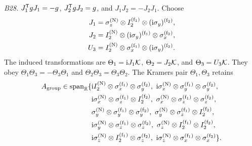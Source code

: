 \begin{samepage}
\medskip\noindent\textit{B28.}\quad
\(J_1^{\mathsf{T}} gJ_1=-g\), \(J_2^{\mathsf{T}} gJ_2=g\), and
\(J_1J_2=-J_2J_1\).
Choose
\begin{equation*}
\begin{aligned}
J_1&=\sigma_z^{({\rm N})}\otimes I_2^{({\rm f}_1)}
       \otimes(\mathrm{i}\sigma_y)^{({\rm f}_2)},\\
J_2&=I_2^{({\rm N})}\otimes(\mathrm{i}\sigma_y)^{({\rm f}_1)}
       \otimes\sigma_x^{({\rm f}_2)},\\
U_3&=I_2^{({\rm N})}\otimes\sigma_x^{({\rm f}_1)}
       \otimes(\mathrm{i}\sigma_y)^{({\rm f}_2)} .
\end{aligned}
\end{equation*}
The induced transformations are \(\Theta_1=\mathrm{i} J_1\mathcal{K}\),
\(\Theta_2=J_2\mathcal{K}\), and \(\Theta_3=U_3\mathcal{K}\).
They obey \(\Theta_1\Theta_3=-\Theta_3\Theta_1\) and
\(\Theta_2\Theta_3=\Theta_3\Theta_2\).  The Kramers pair
\(\Theta_1,\Theta_3\) retains
\begin{align*}
A_{\rm group}\in\operatorname{span}_{\mathbb R}\{&
\mathrm{i} I_2^{({\rm N})}\otimes\sigma_x^{({\rm f}_1)}\otimes\sigma_y^{({\rm f}_2)},
\ \mathrm{i}\sigma_x^{({\rm N})}\otimes\sigma_y^{({\rm f}_1)}\otimes\sigma_y^{({\rm f}_2)},\\
&\mathrm{i}\sigma_x^{({\rm N})}\otimes\sigma_z^{({\rm f}_1)}\otimes I_2^{({\rm f}_2)},
\ \sigma_x^{({\rm N})}\otimes\sigma_z^{({\rm f}_1)}\otimes\sigma_z^{({\rm f}_2)},\\
&\sigma_y^{({\rm N})}\otimes\sigma_y^{({\rm f}_1)}\otimes\sigma_y^{({\rm f}_2)},
\ \sigma_y^{({\rm N})}\otimes\sigma_z^{({\rm f}_1)}\otimes I_2^{({\rm f}_2)},\\
&\mathrm{i}\sigma_y^{({\rm N})}\otimes\sigma_z^{({\rm f}_1)}\otimes\sigma_z^{({\rm f}_2)},
\ \sigma_z^{({\rm N})}\otimes I_2^{({\rm f}_1)}\otimes I_2^{({\rm f}_2)},\\
&\mathrm{i}\sigma_z^{({\rm N})}\otimes I_2^{({\rm f}_1)}\otimes\sigma_z^{({\rm f}_2)},
\ \mathrm{i}\sigma_z^{({\rm N})}\otimes\sigma_x^{({\rm f}_1)}\otimes\sigma_x^{({\rm f}_2)}
\}.
\end{align*}
\end{samepage}

